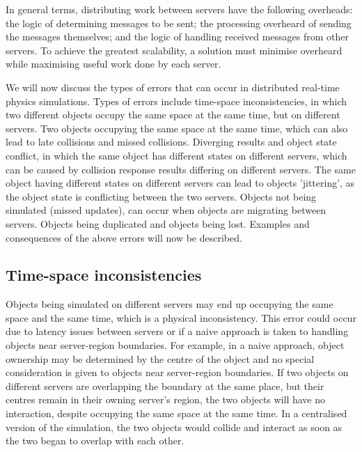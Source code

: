 In general terms, distributing work between servers have the following overheads: the logic of determining messages to be sent; the processing overheard of sending the messages themselves; and the logic of handling received messages from other servers.
To achieve the greatest scalability, a solution must minimise overheard while maximising useful work done by each server.

We will now discuss the types of errors that can occur in distributed real-time physics simulations. Types of errors include time-space inconsistencies, in which two different objects occupy the same space at the same time, but on different servers.
Two objects occupying the same space at the same time, which can also lead to late collisions and missed collisions. 
Diverging results and object state conflict, in which the same object has different states on different servers, which can be caused by collision response results differing on different servers.
The same object having different states on different servers can lead to objects 'jittering', as the object state is conflicting between the two servers. 
Objects not being simulated (missed updates), can occur when objects are migrating between servers. Objects being duplicated and objects being lost. 
Examples and consequences of the above errors will now be described.

\subsection{Time-space inconsistencies}
Objects being simulated on different servers may end up occupying the same space and the same time, which is a physical inconsistency. This error could occur due to latency issues between servers or if a naive approach is taken to handling objects near server-region boundaries. For example, in a naive approach, object ownership may be determined by the centre of the object and no special consideration is given to objects near server-region boundaries. If two objects on different servers are overlapping the boundary at the same place, but their centres remain in their owning server's region, the two objects will have no interaction, despite occupying the same space at the same time. In a centralised version of the simulation, the two objects would collide and interact as soon as the two began to overlap with each other.

